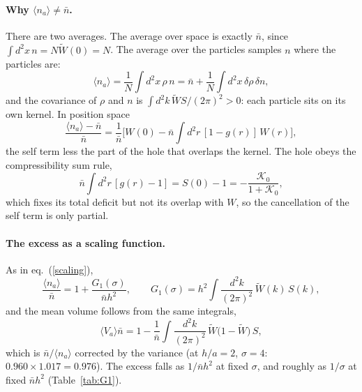 \documentclass[11pt,aps,preprint,nofootinbib,superscriptaddress,tightenlines]{revtex4-2}
\newcommand{\avg}[1]{\langle #1\rangle}
\def\st{\begin{equation}}
\def\stp{\end{equation}}
\def\Eq#1{eq.~(\ref{#1})}
\let\oldparagraph\paragraph
\renewcommand{\paragraph}{\par\bigskip\oldparagraph}
\begin{document}
\paragraph{Why $\avg{n_a}\neq\bar n$.}  There are two averages.  The average over space is exactly $\bar n$, since $\int d^2x\,n=N\widetilde W(0)=N$.  The
average over the particles samples $n$ where the particles are:
\st
\avg{n_a}=\frac1N\int d^2x\,\rho\,n=\bar n+\frac1N\int d^2x\,\delta\rho\,\delta n ,
\stp
and the covariance of $\rho$ and $n$ is $\int d^2k\,\widetilde W S/(2\pi)^2>0$: each particle sits on its own kernel.  In position space
\st
\frac{\avg{n_a}-\bar n}{\bar n}=\frac1{\bar n}\Big[W(0)-\bar n\int d^2r\,[1-g(r)]\,W(r)\Big] ,
\stp
the self term less the part of the hole that overlaps the kernel.  The hole obeys the compressibility sum rule,
\st
\bar n\int d^2r\,[g(r)-1]=S(0)-1=-\frac{\mathcal K_0}{1+\mathcal K_0} ,
\label{sumrule}
\stp
which fixes its total deficit but not its overlap with $W$, so the cancellation of the self term is only partial.

\paragraph{The excess as a scaling function.}  As in \Eq{scaling},
\st
\frac{\avg{n_a}}{\bar n}=1+\frac{G_1(\sigma)}{\bar nh^2},\qquad G_1(\sigma)=h^2\int\frac{d^2k}{(2\pi)^2}\,\widetilde W(k)\,S(k),
\stp
and the mean volume follows from the same integrals,
\st
\avg{V_a}\bar n=1-\frac1{\bar n}\int\frac{d^2k}{(2\pi)^2}\,\widetilde W\big(1-\widetilde W\big)\,S ,
\stp
which is $\bar n/\avg{n_a}$ corrected by the variance (at $h/a=2$, $\sigma=4$: $0.960\times1.017=0.976$).  The excess falls as $1/\bar nh^2$ at fixed $\sigma$, and
roughly as $1/\sigma$ at fixed $\bar nh^2$ (Table~\ref{tab:G1}).
\end{document}
